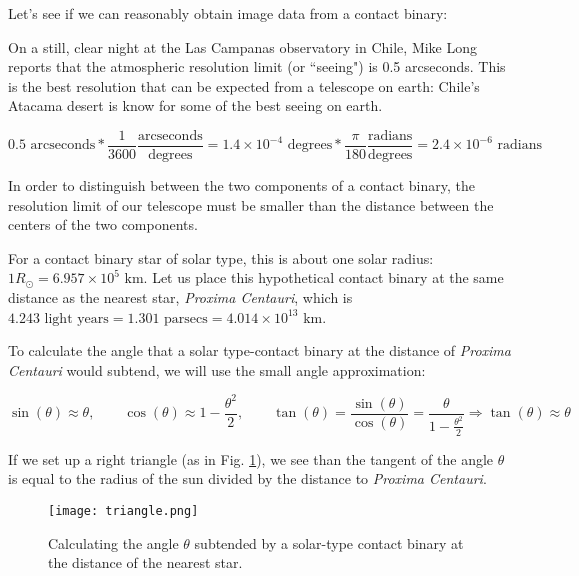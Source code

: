 \documentclass[12pt]{article} %
\numberwithin{equation}{section} %
\begin{document}
Let's see if we can reasonably obtain image data from a contact binary:

On a still, clear night at the Las Campanas observatory in Chile, Mike Long reports that the atmospheric resolution limit (or ``seeing") is 0.5 arcseconds. This is the best resolution that can be expected from a telescope on earth: Chile's Atacama desert is know for some of the best seeing on earth.

\begin{equation} \label{eqn: arcseconds}
0.5 \text{ arcseconds} * \frac{1}{3600} \frac{\text{arcseconds}}{\text{degrees}} = 1.4 \times 10^{-4} \text{ degrees} * \frac{\pi}{180} \frac{\text{radians}}{\text{degrees}} = 2.4 \times 10^{-6} \text{ radians}
\end{equation}

In order to distinguish between the two components of a contact binary, the resolution limit of our telescope must be smaller than the distance between the centers of the two components. 

For a contact binary star of solar type, this is about one solar radius: $1 R_{\odot} = 6.957 \times 10^{5} \text{ km}$. Let us place this hypothetical contact binary at the same distance as the nearest star, \emph{Proxima Centauri}, which is $4.243 \text{ light years} = 1.301 \text{ parsecs} = 4.014 \times 10^{13} \text{ km}$.

To calculate the angle that a solar type-contact binary at the distance of \emph{Proxima Centauri} would subtend, we will use the small angle approximation:

\begin{equation} \label{eqn: smallangle}
\sin(\theta) \approx \theta, \qquad \cos(\theta) \approx 1 - \frac{\theta^{2}}{2}, \qquad \tan(\theta) = \frac{\sin(\theta)}{\cos(\theta)} = \frac{\theta}{1 - \frac{\theta^{2}}{2}} \Rightarrow \tan(\theta) \approx \theta
\end{equation}

If we set up a right triangle (as in Fig. \ref{fig: triangle}), we see than the tangent of the angle $\theta$ is equal to the radius of the sun divided by the distance to \emph{Proxima Centauri}.

\begin{figure}[H]
\centering
\texttt{[image: triangle.png]}
\caption{Calculating the angle $\theta$ subtended by a solar-type contact binary at the distance of the nearest star.}
\label{fig: triangle}
\end{figure}
\end{document}
